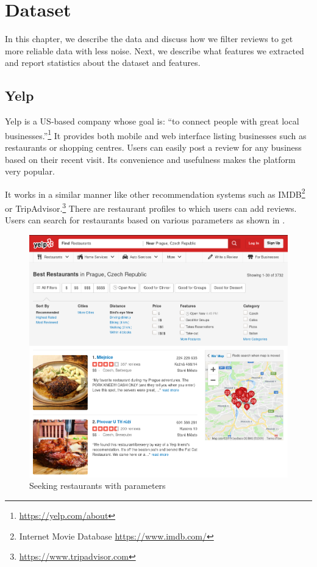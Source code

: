 \chapter{Dataset}\label{chap:dataset}

In this chapter, we describe the data and discuss how we filter reviews to get more reliable data with less noise.
Next, we describe what features we extracted
and report statistics about the dataset and features.

\section{Yelp}\label{sec:yelp}

Yelp is a US-based company whose goal is: ``to connect people with great local businesses.''\footnote{\url{https://yelp.com/about}}
It provides both mobile and web interface listing businesses such as restaurants or shopping centres.
Users can easily post a review for any business based on their recent visit.
Its convenience and usefulness makes the platform very popular.

It works in a similar manner like other recommendation systems such as IMDB\footnote{Internet Movie Database \url{https://www.imdb.com/}} or
TripAdvisor.\footnote{\url{https://www.tripadvisor.com}}
There are restaurant profiles to which users can add reviews.
Users can search for restaurants based on various parameters as shown in .

\begin{figure}[ht]\centering
\includegraphics[width=130mm]{../img/filters.png}
\caption{Seeking restaurants with parameters}
\label{fig:filters}
\end{figure}

